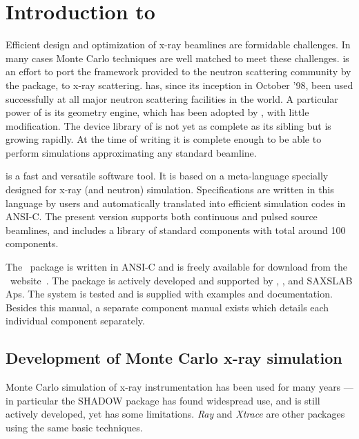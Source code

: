 
\chapter{Introduction to \MCX}

Efficient design and optimization of x-ray beamlines are
formidable challenges. In many cases Monte Carlo techniques are well matched to meet
these challenges. 
\MCX is an effort to port the framework provided to the neutron scattering
community by the \MCS package, to x-ray scattering. \MCS has, since its
inception in October '98, been used successfully at all major neutron
scattering facilities in the world. A particular power of \MCS is its geometry
engine, which has been adopted by \MCX, with little modification. The device
library of \MCX is not yet as complete as its sibling \MCS but is growing
rapidly.
At the time of writing it is complete enough to be able to perform simulations
approximating any standard beamline.

\MCX is a fast and versatile software tool.
It is based on a meta-language specially designed for x-ray (and neutron)
simulation. Specifications are written in this language by users and
automatically translated into efficient simulation codes in ANSI-C.
The present version supports both continuous and pulsed source beamlines, and includes a library of standard
components with total around 100 components.

The \MCX\ package is written in ANSI-C and is freely available for download
from the \MCX\ website~\cite{mcxtrace_webpage}. The package is actively
developed and supported by \DTUPHYSlong, \NBIlong, \ESRFlong and SAXSLAB Aps.
The system is tested and is supplied with examples and documentation.
Besides this manual, a separate component manual exists which details each individual component separately.

\section{Development of Monte Carlo x-ray simulation}
Monte Carlo simulation of x-ray instrumentation has been used for many years --- in particular the SHADOW package 
\cite{welnak1994shadow,sanchez2011shadow3}
has found widespread use, and is still actively developed, yet has some
limitations. \emph{Ray}\cite{schaefers2008bessy} and \emph{Xtrace}\cite{bauer2007simulation} are other packages using the same
basic techniques. 

